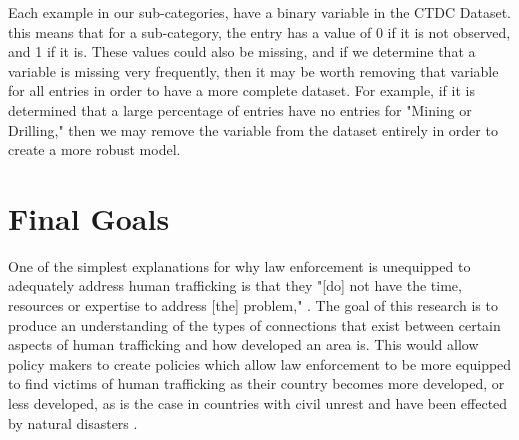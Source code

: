 \documentclass{article} %
\begin{document}
Each example in our sub-categories, have a binary variable in the CTDC Dataset. this means that for a sub-category, the entry has a value of 0 if it is not observed, and 1 if it is. These values could also be missing, and if we determine that a variable is missing very frequently, then it may be worth removing that variable for all entries in order to have a more complete dataset. For example, if it is determined that a large percentage of entries have no entries for "Mining or Drilling," then we may remove the variable from the dataset entirely in order to create a more robust model.


\section{Final Goals}

One of the simplest explanations for why law enforcement is unequipped to adequately address human trafficking is that they "[do] not have the time,
resources or expertise to address [the] problem," \parencite{LawResponse}. The goal of this research is to produce an understanding of the types of connections that exist between certain aspects of human trafficking and how developed an area is. This would allow policy makers to create policies which allow law enforcement to be more equipped to find victims of human trafficking as their country becomes more developed, or less developed, as is the case in countries with civil unrest and have been effected by natural disasters \parencite{bar2010}.


\printbibliography
\end{document}
